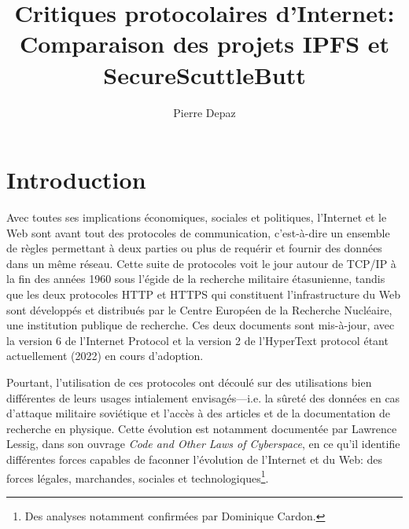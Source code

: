 \documentclass{article}
\begin{document}
\title{Critiques protocolaires d'Internet: Comparaison des projets IPFS et SecureScuttleButt}
\author{Pierre Depaz}
\maketitle

\section{Introduction}

Avec toutes ses implications économiques, sociales et politiques, l'Internet et le Web\cite{fielding_hypertext_2014} sont avant tout des protocoles de communication, c'est-à-dire un ensemble de règles permettant à deux parties ou plus de requérir et fournir des données dans un même réseau. Cette suite de protocoles voit le jour autour de TCP/IP à la fin des années 1960 sous l'égide de la recherche militaire étasunienne, tandis que les deux protocoles HTTP et HTTPS qui constituent l'infrastructure du Web sont développés et distribués par le Centre Européen de la Recherche Nucléaire, une institution publique de recherche. Ces deux documents sont mis-à-jour, avec la version 6 de l'Internet Protocol et la version 2 de l'HyperText protocol étant actuellement (2022) en cours d'adoption.

Pourtant, l'utilisation de ces protocoles ont découlé sur des utilisations bien différentes de leurs usages intialement envisagés—i.e. la sûreté des données en cas d'attaque militaire soviétique et l'accès à des articles et de la documentation de recherche en physique. Cette évolution est notamment documentée par Lawrence Lessig, dans son ouvrage \emph{Code and Other Laws of Cyberspace}\cite{lessig_code_1999}, en ce qu'il identifie différentes forces capables de faconner l'évolution de l'Internet et du Web: des forces légales, marchandes, sociales et technologiques\footnote{Des analyses notamment confirmées par Dominique Cardon.}.
\end{document}
